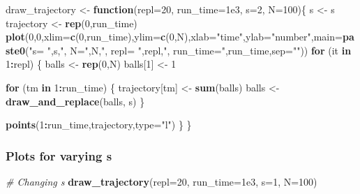 \documentclass[
]{article}
\newenvironment{Shaded}{\begin{snugshade}}{\end{snugshade}}
\newcommand{\AttributeTok}[1]{\textcolor[rgb]{0.13,0.29,0.53}{#1}}
\newcommand{\CommentTok}[1]{\textcolor[rgb]{0.56,0.35,0.01}{\textit{#1}}}
\newcommand{\ControlFlowTok}[1]{\textcolor[rgb]{0.13,0.29,0.53}{\textbf{#1}}}
\newcommand{\DecValTok}[1]{\textcolor[rgb]{0.00,0.00,0.81}{#1}}
\newcommand{\FloatTok}[1]{\textcolor[rgb]{0.00,0.00,0.81}{#1}}
\newcommand{\FunctionTok}[1]{\textcolor[rgb]{0.13,0.29,0.53}{\textbf{#1}}}
\newcommand{\NormalTok}[1]{#1}
\newcommand{\OtherTok}[1]{\textcolor[rgb]{0.56,0.35,0.01}{#1}}
\newcommand{\SpecialCharTok}[1]{\textcolor[rgb]{0.81,0.36,0.00}{\textbf{#1}}}
\newcommand{\StringTok}[1]{\textcolor[rgb]{0.31,0.60,0.02}{#1}}
\begin{document}
\begin{Shaded}
\begin{Highlighting}[]
\NormalTok{draw\_trajectory }\OtherTok{\textless{}{-}} \ControlFlowTok{function}\NormalTok{(}\AttributeTok{repl=}\DecValTok{20}\NormalTok{, }\AttributeTok{run\_time=}\FloatTok{1e3}\NormalTok{, }\AttributeTok{s=}\DecValTok{2}\NormalTok{, }\AttributeTok{N=}\DecValTok{100}\NormalTok{)\{}
\NormalTok{  s }\OtherTok{\textless{}{-}}\NormalTok{ s}
\NormalTok{  trajectory }\OtherTok{\textless{}{-}} \FunctionTok{rep}\NormalTok{(}\DecValTok{0}\NormalTok{,run\_time)}
  \FunctionTok{plot}\NormalTok{(}\DecValTok{0}\NormalTok{,}\DecValTok{0}\NormalTok{,}\AttributeTok{xlim=}\FunctionTok{c}\NormalTok{(}\DecValTok{0}\NormalTok{,run\_time),}\AttributeTok{ylim=}\FunctionTok{c}\NormalTok{(}\DecValTok{0}\NormalTok{,N),}\AttributeTok{xlab=}\StringTok{"time"}\NormalTok{,}\AttributeTok{ylab=}\StringTok{"number"}\NormalTok{,}\AttributeTok{main=}\FunctionTok{paste0}\NormalTok{(}\StringTok{"s= "}\NormalTok{,s,}\StringTok{", N="}\NormalTok{,N,}\StringTok{", repl= "}\NormalTok{,repl,}\StringTok{", run\_time="}\NormalTok{,run\_time,}\AttributeTok{sep=}\StringTok{""}\NormalTok{))}
  \ControlFlowTok{for}\NormalTok{ (it }\ControlFlowTok{in} \DecValTok{1}\SpecialCharTok{:}\NormalTok{repl) \{}
\NormalTok{    balls }\OtherTok{\textless{}{-}} \FunctionTok{rep}\NormalTok{(}\DecValTok{0}\NormalTok{,N)}
\NormalTok{    balls[}\DecValTok{1}\NormalTok{] }\OtherTok{\textless{}{-}} \DecValTok{1}
    
    \ControlFlowTok{for}\NormalTok{ (tm }\ControlFlowTok{in} \DecValTok{1}\SpecialCharTok{:}\NormalTok{run\_time) \{}
\NormalTok{      trajectory[tm] }\OtherTok{\textless{}{-}} \FunctionTok{sum}\NormalTok{(balls)}
\NormalTok{      balls }\OtherTok{\textless{}{-}} \FunctionTok{draw\_and\_replace}\NormalTok{(balls, s)}
\NormalTok{    \}}
    
    \FunctionTok{points}\NormalTok{(}\DecValTok{1}\SpecialCharTok{:}\NormalTok{run\_time,trajectory,}\AttributeTok{type=}\StringTok{"l"}\NormalTok{)}
\NormalTok{  \}}
\NormalTok{\}}
\end{Highlighting}
\end{Shaded}

\hypertarget{plots-for-varying-s}{%
\subsubsection{Plots for varying s}\label{plots-for-varying-s}}

\begin{Shaded}
\begin{Highlighting}[]
\CommentTok{\# Changing s }
\FunctionTok{draw\_trajectory}\NormalTok{(}\AttributeTok{repl=}\DecValTok{20}\NormalTok{, }\AttributeTok{run\_time=}\FloatTok{1e3}\NormalTok{, }\AttributeTok{s=}\DecValTok{1}\NormalTok{, }\AttributeTok{N=}\DecValTok{100}\NormalTok{)}
\end{Highlighting}
\end{Shaded}
\end{document}

